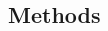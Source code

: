 \documentclass[a0,portrait]{a0poster}
\begin{document}
\begin{multicols}{2}


\section*{Methods}


\end{multicols}
\end{document}
